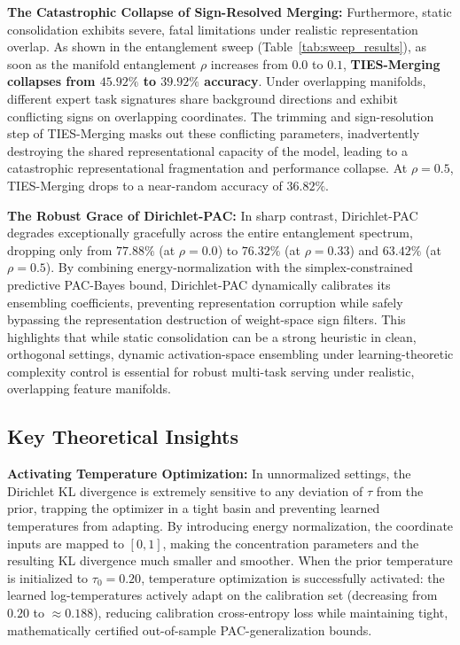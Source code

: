 \textbf{The Catastrophic Collapse of Sign-Resolved Merging:}
Furthermore, static consolidation exhibits severe, fatal limitations under realistic representation overlap. As shown in the entanglement sweep (Table~\ref{tab:sweep_results}), as soon as the manifold entanglement $\rho$ increases from $0.0$ to $0.1$, \textbf{TIES-Merging collapses from $45.92\%$ to $39.92\%$ accuracy}. Under overlapping manifolds, different expert task signatures share background directions and exhibit conflicting signs on overlapping coordinates. The trimming and sign-resolution step of TIES-Merging masks out these conflicting parameters, inadvertently destroying the shared representational capacity of the model, leading to a catastrophic representational fragmentation and performance collapse. At $\rho=0.5$, TIES-Merging drops to a near-random accuracy of $36.82\%$.

\textbf{The Robust Grace of Dirichlet-PAC:}
In sharp contrast, Dirichlet-PAC degrades exceptionally gracefully across the entire entanglement spectrum, dropping only from $77.88\%$ (at $\rho=0.0$) to $76.32\%$ (at $\rho=0.33$) and $63.42\%$ (at $\rho=0.5$). By combining energy-normalization with the simplex-constrained predictive PAC-Bayes bound, Dirichlet-PAC dynamically calibrates its ensembling coefficients, preventing representation corruption while safely bypassing the representation destruction of weight-space sign filters. This highlights that while static consolidation can be a strong heuristic in clean, orthogonal settings, dynamic activation-space ensembling under learning-theoretic complexity control is essential for robust multi-task serving under realistic, overlapping feature manifolds.

\subsection{Key Theoretical Insights}
\textbf{Activating Temperature Optimization:}
In unnormalized settings, the Dirichlet KL divergence is extremely sensitive to any deviation of $\tau$ from the prior, trapping the optimizer in a tight basin and preventing learned temperatures from adapting. By introducing energy normalization, the coordinate inputs are mapped to $[0, 1]$, making the concentration parameters and the resulting KL divergence much smaller and smoother. When the prior temperature is initialized to $\tau_0 = 0.20$, temperature optimization is successfully activated: the learned log-temperatures actively adapt on the calibration set (decreasing from $0.20$ to $\approx 0.188$), reducing calibration cross-entropy loss while maintaining tight, mathematically certified out-of-sample PAC-generalization bounds.

